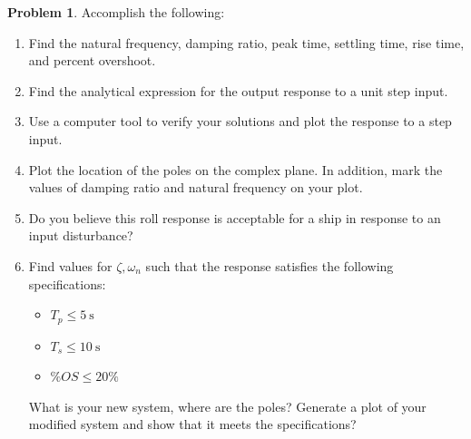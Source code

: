 \documentclass[10pt]{article}
\theoremstyle{definition}
\newtheorem{prob}{Problem}[section]
\newenvironment{subprob}%
{\renewcommand{\theenumi}{\alph{enumi}}\renewcommand{\labelenumi}{(\theenumi)}\begin{enumerate}}%
{\end{enumerate}}%
\begin{document}
\begin{prob}
    Accomplish the following:
    \begin{subprob}
        \item Find the natural frequency, damping ratio, peak time, settling time, rise time, and percent overshoot.
        \item Find the analytical expression for the output response to a unit step input.
        \item Use a computer tool to verify your solutions and plot the response to a step input.
        \item Plot the location of the poles on the complex plane. 
            In addition, mark the values of damping ratio and natural frequency on your plot.
        \item Do you believe this roll response is acceptable for a ship in response to an input disturbance?
        \item Find values for \( \zeta, \omega_n\) such that the response satisfies the following specifications:
            \begin{itemize}
                \item \( T_p \leq \SI{5}{\second}\)
                \item \( T_s \leq \SI{10}{\second}\)
                \item \( \% OS \leq 20\%\)
            \end{itemize}
            What is your new system, where are the poles?
            Generate a plot of your modified system and show that it meets the specifications?
    \end{subprob}
\end{prob}
\end{document}
